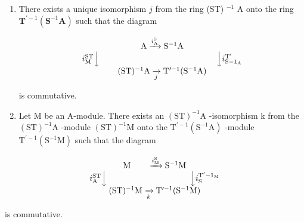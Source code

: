 \begin{enumerate}
\def\labelenumi{(\roman{enumi})}
\tightlist
\item
  There exists a unique isomorphism \(j\) from the ring (ST) \(^{-1}\) A onto the ring \(\mathbf{T}^{\prime -1}(\mathbf{S}^{-1}\mathbf{A})\) such that the diagram

\[
\begin{array}{c} \mathrm{A} \xrightarrow {i _ {\mathrm{A}} ^ {\mathrm{S}}} \mathrm{S} ^ {- 1} \mathrm{A} \\ i _ {\mathrm{M}} ^ {\mathrm{ST}} \Big \downarrow \qquad \qquad \qquad \qquad \qquad \qquad \qquad \Big \downarrow i _ {\mathrm{S} - 1 _ {\mathrm{A}}} ^ {\mathrm{T} ^ {\prime}} \\ (\mathrm{ST}) ^ {- 1} \mathrm{A} \xrightarrow [ j ]{} \mathrm{T} ^ {\prime - 1} (\mathrm{S} ^ {- 1} \mathrm{A}) \end{array}
\]

is commutative.

\item
  Let M be an A-module. There exists an \((\mathrm{ST})^{-1}\mathrm{A}\) -isomorphism k from the \((\mathrm{ST})^{-1}\mathrm{A}\) -module \((\mathrm{ST})^{-1}\mathrm{M}\) onto the \(\mathrm{T}^{\prime-1}(\mathrm{S}^{-1}\mathrm{A})\) -module \(\mathrm{T}^{\prime-1}(\mathrm{S}^{-1}\mathrm{M})\) such that the diagram
\end{enumerate}

\[
\begin{array}{c} \mathrm{M} \qquad \xrightarrow {i _ {\mathrm{M}} ^ {\mathrm{S}}} \mathrm{S} ^ {- 1} \mathrm{M} \\ i _ {\mathrm{A}} ^ {\mathrm{ST}} \Big \downarrow \qquad \qquad \qquad \qquad \qquad \Big \downarrow i _ {\mathrm{S}} ^ {\mathrm{T} ^ {\prime} - 1 _ {\mathrm{M}}} \\ (\mathrm{ST}) ^ {- 1} \mathrm{M} \xrightarrow [ k ]{} \mathrm{T} ^ {\prime - 1} (\mathrm{S} ^ {- 1} \mathrm{M}) \end{array}
\]

is commutative.

